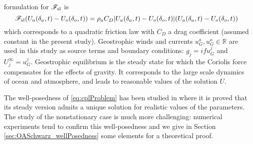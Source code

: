 formulation for ${\cal F}_{\rm sl}$ is
\[
{\cal F}_{\rm sl}( U_a(\delta_a,t)-U_o(\delta_o,t) ) = 
\rho_a C_D | U_a(\delta_a,t)-U_o(\delta_o,t) | (U_a(\delta_a,t)-U_o(\delta_o,t))
\]
which corresponds to a quadratic friction law with $C_D$ 
a drag coefficient (assumed constant in the present study).
%
%
Geostrophic winds and currents $u_G^a, u_G^o \in \mathbb{R}$
are used in this study as
source terms and boundary conditions: $g_j = if u_G^j$ and
$U_j^\infty = u_G^j$.
Geostrophic equilibrium is the steady state for which the 
Coriolis force compensates for the effects of gravity.
It corresponds to the large scale dynamics of ocean and 
atmosphere, and leads to reasonable values of the solution $U$. \par
The well-posedness of \eqref{eq:cplProblem} has been studied in 
\cite{thery_etude_2021}
where it is proved that its steady version admits a unique
solution for realistic values of the parameters. The study of the
nonstationary case is much more challenging: numerical experiments
tend to confirm this well-posedness and we give in Section
\ref{sec:OASchwarz_wellPosedness} some elements for a theoretical proof.
%
%
%
%
%
%
%
%
%
% 
%
%

